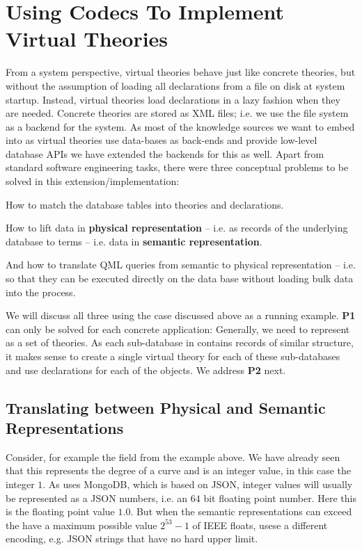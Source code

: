 \section{Using Codecs To Implement \lmfdb Virtual Theories}\label{sec:vt}

From a system perspective, virtual theories behave just like concrete theories, but
without the assumption of loading all declarations from a file on disk at system startup.
Instead, virtual theories load declarations in a lazy fashion when they are
needed. Concrete theories are stored as XML files; i.e. we use the file system as a
backend for the \mmt system. As most of the knowledge sources we want to embed into \ommt
as virtual theories use data-bases as back-ends and provide low-level database APIs we
have extended the \mmt backends for this as well. Apart from standard software engineering
tasks, there were three conceptual problems to be solved in this extension/implementation:
\begin{compactenum}[\bf P1]
\item How to match the database tables into \ommt theories and declarations. 
\item How to lift data in \textbf{physical representation} -- i.e. as records of the
  underlying database to \ommt terms -- i.e. data in \textbf{semantic representation}.
\item And how to translate QML queries from semantic to physical representation -- i.e. so
  that they can be executed directly on the data base without loading bulk data into the
  \mmt process.
\end{compactenum}
We will discuss all three using the \lmfdb case discussed above as a running
example. \textbf{P1} can only be solved for each concrete application: Generally, we need
to represent \lmfdb as a set of \ommt theories.  As each sub-database in \lmfdb contains
records of similar structure, it makes sense to create a single virtual theory for each of
these sub-databases and use \ommt declarations for each of the objects. We address
\textbf{P2} next.

\subsection{Translating between Physical and Semantic Representations}\label{sec:vt:translation}

Consider, for example the  field from the example above.  We have
already seen that this represents the degree of a curve and is an integer value, in this
case the integer $1$.  As \lmfdb uses MongoDB, which is based on JSON, integer values will
usually be represented as a JSON numbers, i.e. an  $64$ bit floating
point number.  Here this is the floating point value $1.0$. But when the semantic
representations can exceed the have a maximum possible value $2^{53}-1$ of IEEE floats,
\lmfdb usese a different encoding, e.g. JSON strings that have no hard upper limit.

